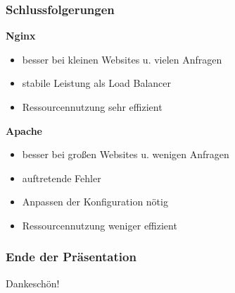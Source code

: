 \documentclass{beamer}
\begin{document}
\begin{frame}
    \frametitle{Schlussfolgerungen}
    \textbf{Nginx}
    \begin{itemize}
        \item besser bei kleinen Websites u. vielen Anfragen
        \item stabile Leistung als Load Balancer
        \item Ressourcennutzung sehr effizient
    \end{itemize}
    \textbf{Apache}
    \begin{itemize}
        \item besser bei großen Websites u. wenigen Anfragen
        \item auftretende Fehler
        \item Anpassen der Konfiguration nötig
        \item Ressourcennutzung weniger effizient
    \end{itemize}
\end{frame}


\begin{frame}
    \frametitle{Ende der Präsentation}
    Dankeschön!
\end{frame}

\end{document}
